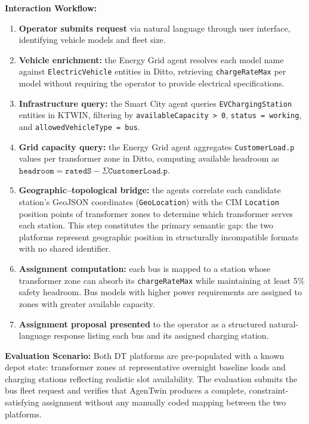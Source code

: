 \textbf{Interaction Workflow:}
\begin{enumerate}
    \item \textbf{Operator submits request} via natural language through user interface,
        identifying vehicle models and fleet size.
    \item \textbf{Vehicle enrichment:} the Energy Grid agent resolves each model name against
        \texttt{ElectricVehicle} entities in Ditto,
        retrieving \texttt{chargeRateMax} per model without requiring
        the operator to provide electrical specifications.
    \item \textbf{Infrastructure query:} the Smart City agent queries \texttt{EVChargingStation}
        entities in KTWIN, filtering by
        \texttt{availableCapacity > 0},
        \texttt{status = working}, and
        \texttt{allowedVehicleType = bus}.
    \item \textbf{Grid capacity query:} the Energy Grid agent aggregates
        \texttt{CustomerLoad.p} values per transformer zone in Ditto,
        computing available headroom as
        $\texttt{headroom} = \texttt{ratedS} - \Sigma\texttt{CustomerLoad.p}$.
    \item \textbf{Geographic--topological bridge:} the agents correlate each candidate station's
        GeoJSON coordinates (\texttt{GeoLocation}) with the CIM \texttt{Location} position points
        of transformer zones to determine which transformer serves each station.
        This step constitutes the primary semantic gap: the two platforms
        represent geographic position in structurally incompatible formats with no shared identifier.
    \item \textbf{Assignment computation:} each bus is mapped to a station whose transformer zone
        can absorb its \texttt{chargeRateMax} while maintaining at least 5\% safety headroom.
        Bus models with higher power requirements are assigned to zones with greater available capacity.
    \item \textbf{Assignment proposal presented} to the operator as a structured natural-language
        response listing each bus and its assigned charging station.
\end{enumerate}

\textbf{Evaluation Scenario:}
Both DT platforms are pre-populated with a known depot state:
    transformer zones at representative overnight baseline loads and
    charging stations reflecting realistic slot availability.
The evaluation submits the bus fleet request and verifies that
    AgenTwin produces a complete, constraint-satisfying assignment
    without any manually coded mapping between the two platforms.


